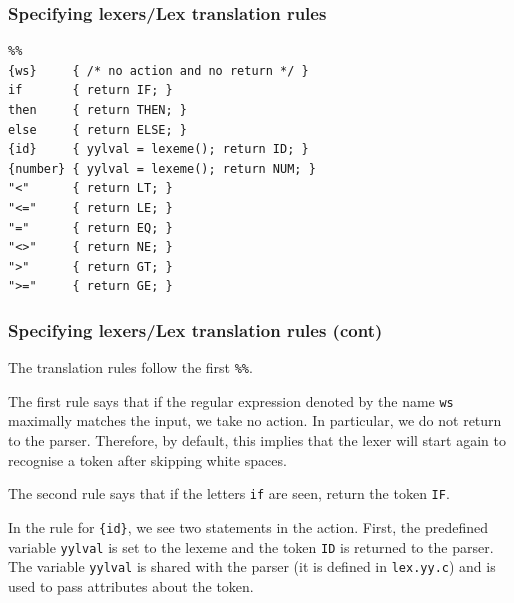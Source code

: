%
\begin{frame}[containsverbatim]
\frametitle{Specifying lexers/Lex translation rules}

{\small
\begin{verbatim}
%%
{ws}     { /* no action and no return */ }
if       { return IF; }
then     { return THEN; }
else     { return ELSE; }
{id}     { yylval = lexeme(); return ID; }
{number} { yylval = lexeme(); return NUM; }
"<"      { return LT; }
"<="     { return LE; }
"="      { return EQ; }
"<>"     { return NE; }
">"      { return GT; }
">="     { return GE; }
\end{verbatim}
}

\end{frame}

%
\begin{frame}[containsverbatim]
\frametitle{Specifying lexers/Lex translation rules
(cont)}

The translation rules follow the first \verb+%%+.

\bigskip

The first rule says that if the regular expression denoted by the
name \texttt{ws} maximally matches the input, we take no action. In
particular, we do not return to the parser. Therefore, by default,
this implies that the lexer will start again to recognise a token
after skipping white spaces.

\bigskip

The second rule says that if the letters \texttt{if} are seen, return
the token \texttt{IF}.

\bigskip

In the rule for \verb+{id}+, we see two statements in the
action. First, the \Lex predefined variable \texttt{yylval} is set to
the lexeme and the token \texttt{ID} is returned to the parser. The
variable \texttt{yylval} is shared with the parser (it is defined
in \texttt{lex.yy.c}) and is used to pass attributes about the token.

\end{frame}

